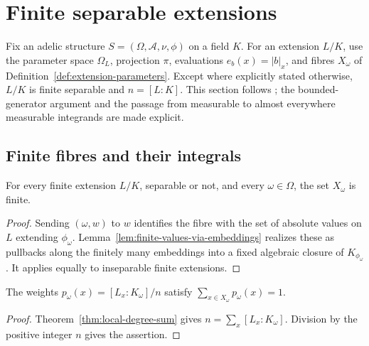 \section{Finite separable extensions}

Fix an adelic structure $S=(\Omega,\mathcal A,\nu,\phi)$ on a field $K$.
For an extension $L/K$, use the parameter space $\Omega_L$, projection
$\pi$, evaluations $e_b(x)=|b|_x$, and fibres $X_\omega$ of
Definition~\ref{def:extension-parameters}. Except where explicitly stated
otherwise, $L/K$ is finite separable and $n=[L:K]$. This section follows
\cite[\S3.3]{chen-moriwaki}; the bounded-generator argument and the passage
from measurable to almost everywhere measurable integrands are made explicit.

\subsection{Finite fibres and their integrals}

\begin{lemma}\label{lem:finite-extension-fibres}
\leanok
{}
For every finite extension $L/K$, separable or not, and every $\omega\in\Omega$,
the set $X_\omega$ is finite.
\end{lemma}
\begin{proof}
Sending $(\omega,w)$ to $w$ identifies the fibre with the set of absolute
values on $L$ extending $\phi_\omega$. Lemma~\ref{lem:finite-values-via-embeddings}
realizes these as pullbacks along the finitely many embeddings into a fixed
algebraic closure of $K_{\phi_\omega}$. It applies equally to inseparable
finite extensions.
\end{proof}

\begin{lemma}\label{lem:fibre-normalization}
\leanok
{}
The weights $p_\omega(x)=[L_x:K_\omega]/n$ satisfy
$\sum_{x\in X_\omega}p_\omega(x)=1$.
\end{lemma}
\begin{proof}
Theorem~\ref{thm:local-degree-sum} gives
$n=\sum_x[L_x:K_\omega]$. Division by the positive integer $n$
gives the assertion.
\end{proof}

